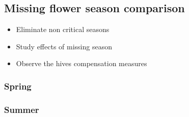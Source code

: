 \documentclass[
	paper=128mm:96mm,
	fontsize=11pt,
	pagesize,
	parskip=half-,
]{scrartcl}
\theoremstyle{mythmstyle} %
\begin{document}
\subsection*{Missing flower season comparison}
	\begin{itemize}
		\item Eliminate non critical seasons
		\item Study effects of missing season
		\item Observe the hives compensation measures
	\end{itemize}
	\clearpage
\subsubsection*{Spring}
	\begin{figure}[H]
	\end{figure}
	\clearpage
\subsubsection*{Summer}
	\begin{figure}[H]
	\end{figure}
	\clearpage
\end{document}
